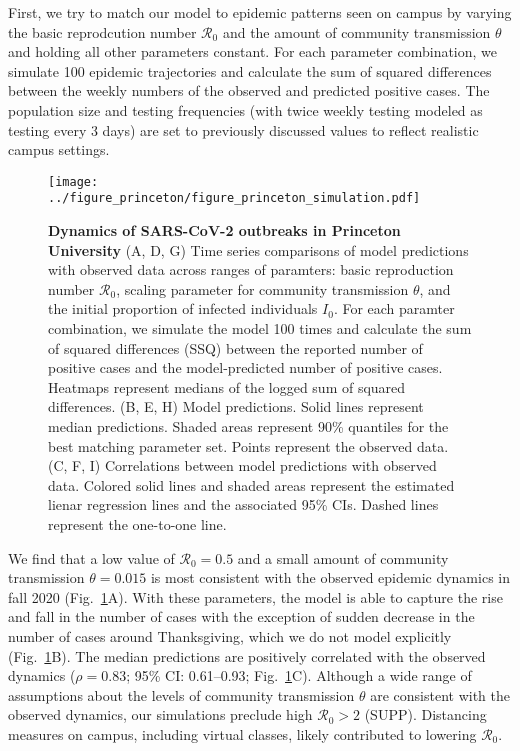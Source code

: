 \documentclass[12pt]{article}
\newcommand{\fref}[1]{Fig.~\ref{fig:#1}}
\begin{document}
First, we try to match our model to epidemic patterns seen on campus by varying the basic reprodcution number $\mathcal R_0$ and the amount of community transmission $\theta$ and holding all other parameters constant.
For each parameter combination, we simulate 100 epidemic trajectories and calculate the sum of squared differences between the weekly numbers of the observed and predicted positive cases.
The population size and testing frequencies (with twice weekly testing modeled as testing every 3 days) are set to previously discussed values to reflect realistic campus settings.


\begin{figure}[!th]
\texttt{[image: ../figure\_princeton/figure\_princeton\_simulation.pdf]}
\caption{
\textbf{Dynamics of SARS-CoV-2 outbreaks in Princeton University}
(A, D, G) Time series comparisons of model predictions with observed data across ranges of paramters: basic reproduction number $\mathcal R_0$, scaling parameter for community transmission $\theta$, and the initial proportion of infected individuals $I_0$.
For each paramter combination, we simulate the model 100 times and calculate the sum of squared differences (SSQ) between the reported number of positive cases and the model-predicted number of positive cases. 
Heatmaps represent medians of the logged sum of squared differences.
(B, E, H) Model predictions. 
Solid lines represent median predictions.
Shaded areas represent 90\% quantiles for the best matching parameter set.
Points represent the observed data.
(C, F, I) Correlations between model predictions with observed data.
Colored solid lines and shaded areas represent the estimated lienar regression lines and the associated 95\% CIs.
Dashed lines represent the one-to-one line.
\label{fig:matching}
}
\end{figure}


We find that a low value of $\mathcal R_0=0.5$ and a small amount of community transmission $\theta=0.015$ is most consistent with the observed epidemic dynamics in fall 2020 (\fref{matching}A).
With these parameters, the model is able to capture the rise and fall in the number of cases with the exception of sudden decrease in the number of cases around Thanksgiving, which we do not model explicitly (\fref{matching}B).
The median predictions are positively correlated with the observed dynamics ($\rho = 0.83$; 95\% CI: 0.61--0.93; \fref{matching}C).
Although a wide range of assumptions about the levels of community transmission $\theta$ are consistent with the observed dynamics, our simulations preclude high $\mathcal R_0 > 2$ (SUPP).
Distancing measures on campus, including virtual classes, likely contributed to lowering $\mathcal R_0$.
\end{document}
